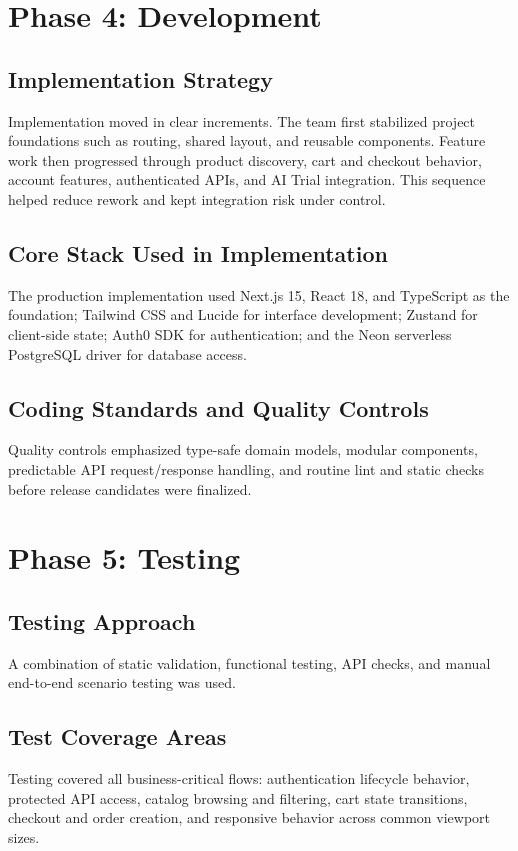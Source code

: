 \documentclass[12pt,a4paper]{article}
\begin{document}
\section{Phase 4: Development}
\subsection{Implementation Strategy}
Implementation moved in clear increments. The team first stabilized project foundations such as routing, shared layout, and reusable components. Feature work then progressed through product discovery, cart and checkout behavior, account features, authenticated APIs, and AI Trial integration. This sequence helped reduce rework and kept integration risk under control.

\subsection{Core Stack Used in Implementation}
The production implementation used Next.js 15, React 18, and TypeScript as the foundation; Tailwind CSS and Lucide for interface development; Zustand for client-side state; Auth0 SDK for authentication; and the Neon serverless PostgreSQL driver for database access.

\subsection{Coding Standards and Quality Controls}
Quality controls emphasized type-safe domain models, modular components, predictable API request/response handling, and routine lint and static checks before release candidates were finalized.

\section{Phase 5: Testing}
\subsection{Testing Approach}
A combination of static validation, functional testing, API checks, and manual end-to-end scenario testing was used.

\subsection{Test Coverage Areas}
Testing covered all business-critical flows: authentication lifecycle behavior, protected API access, catalog browsing and filtering, cart state transitions, checkout and order creation, and responsive behavior across common viewport sizes.
\end{document}

